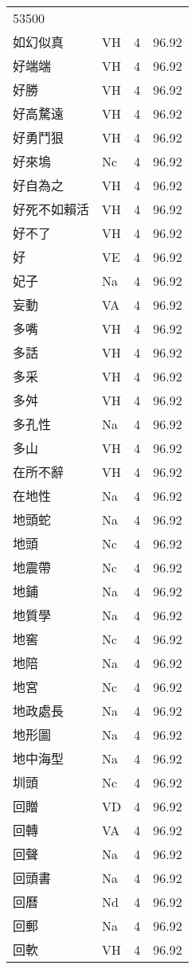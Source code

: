\documentclass[twocolumn]{book}
\begin{document}
\begin{supertabular}{llrr}
53500\\
如幻似真 & VH & 4 &  96.92\\
好端端 & VH & 4 &  96.92\\
好勝 & VH & 4 &  96.92\\
好高騖遠 & VH & 4 &  96.92\\
好勇鬥狠 & VH & 4 &  96.92\\
好來塢 & Nc & 4 &  96.92\\
好自為之 & VH & 4 &  96.92\\
好死不如賴活 & VH & 4 &  96.92\\
好不了 & VH & 4 &  96.92\\
好 & VE & 4 &  96.92\\
妃子 & Na & 4 &  96.92\\
妄動 & VA & 4 &  96.92\\
多嘴 & VH & 4 &  96.92\\
多話 & VH & 4 &  96.92\\
多采 & VH & 4 &  96.92\\
多舛 & VH & 4 &  96.92\\
多孔性 & Na & 4 &  96.92\\
多山 & VH & 4 &  96.92\\
在所不辭 & VH & 4 &  96.92\\
在地性 & Na & 4 &  96.92\\
地頭蛇 & Na & 4 &  96.92\\
地頭 & Nc & 4 &  96.92\\
地震帶 & Nc & 4 &  96.92\\
地鋪 & Na & 4 &  96.92\\
地質學 & Na & 4 &  96.92\\
地窖 & Nc & 4 &  96.92\\
地陪 & Na & 4 &  96.92\\
地宮 & Nc & 4 &  96.92\\
地政處長 & Na & 4 &  96.92\\
地形圖 & Na & 4 &  96.92\\
地中海型 & Na & 4 &  96.92\\
圳頭 & Nc & 4 &  96.92\\
回贈 & VD & 4 &  96.92\\
回轉 & VA & 4 &  96.92\\
回聲 & Na & 4 &  96.92\\
回頭書 & Na & 4 &  96.92\\
回曆 & Nd & 4 &  96.92\\
回郵 & Na & 4 &  96.92\\
回軟 & VH & 4 &  96.92\\

\end{supertabular}
\end{document}
